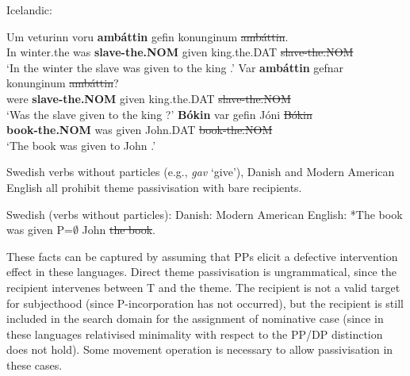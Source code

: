 \begin{exe}
	\ex Icelandic:\label{ex:ice-directthe}
\begin{xlist}
	\ex \gll Um veturinn voru \textbf{amb\'{a}ttin} gefin konunginum \sout{amb\'{a}ttin}.\\
	In winter.the was \textbf{slave-the.NOM} given king.the.DAT \sout{slave-the.NOM}\\
\trans `In the winter the slave was given to the king \citep[ex. 47b]{Zaenen.1985}.'
\ex \gll Var \textbf{amb\'{a}ttin} gefnar konunginum \sout{amb\'{a}ttin}?\\
were \textbf{slave-the.NOM} given king.the.DAT \sout{slave-the.NOM}\\
\trans `Was the slave given to the king \citep[ex. 48b]{Zaenen.1985}?'
\ex \gll \textbf{B\'{o}kin} var gefin J\'{o}ni \sout{B\'{o}kin}\\
\textbf{book-the.NOM} was given John.DAT \sout{book-the.NOM}\\
\trans `The book was given to John \citep{Holmberg.1995,Bardal.2001}.'
\end{xlist}
\end{exe}

Swedish verbs without particles (e.g., \textit{gav} `give'), Danish and Modern American English all prohibit theme passivisation with bare recipients.

\begin{exe}
	\ex Swedish (verbs without particles):\label{ex:swe-nopart-pass}
	 \ex Danish:\label{ex:dan-pass}
\ex Modern American English: *The book was given P=$\emptyset$ John \sout{the book}.\label{ex:amen-pass}
\end{exe}

These facts can be captured by assuming that PPs elicit a defective intervention effect \citep{Chomsky.1998} in these languages. Direct theme passivisation is ungrammatical, since the recipient intervenes between T and the theme. The recipient is not a valid target for subjecthood (since P-incorporation has not occurred), but the recipient is still included in the search domain for the assignment of nominative case (since in these languages relativised minimality with respect to the PP/DP distinction does not hold). Some movement operation is necessary to allow passivisation in these cases.  

